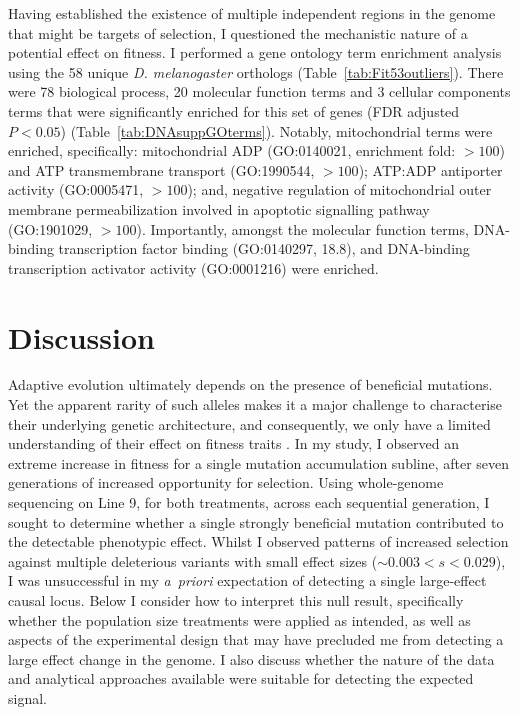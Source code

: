 Having established the existence of multiple independent regions in the genome that might be targets of selection, I questioned the mechanistic nature of a potential effect on fitness. I performed a gene ontology term enrichment analysis using the 58 unique \textit{D. melanogaster} orthologs (Table~\ref{tab:Fit53outliers}). There were 78 biological process, 20 molecular function terms and 3 cellular components terms that were significantly enriched for this set of genes (FDR adjusted $P < 0.05$) (Table~\ref{tab:DNAsuppGOterms}). Notably, mitochondrial terms were enriched, specifically: mitochondrial ADP (GO:0140021, enrichment fold: $>100$) and ATP transmembrane transport (GO:1990544, $>100$); ATP:ADP antiporter activity (GO:0005471, $>100$); and, negative regulation of mitochondrial outer membrane permeabilization involved in apoptotic signalling pathway (GO:1901029, $>100$). Importantly, amongst the molecular function terms, DNA-binding transcription factor binding (GO:0140297, 18.8), and DNA-binding transcription activator activity (GO:0001216) were enriched. \par

\section{Discussion}
Adaptive evolution ultimately depends on the presence of beneficial mutations. Yet the apparent rarity of such alleles makes it a major challenge to characterise their underlying genetic architecture, and consequently, we only have a limited understanding of their effect on fitness traits \citep{Eyre07, Wals18c12}. In my study, I observed an extreme increase in fitness for a single mutation accumulation subline, after seven generations of increased opportunity for selection. Using whole-genome sequencing on Line 9, for both treatments, across each sequential generation, I sought to determine whether a single strongly beneficial mutation contributed to the detectable phenotypic effect. Whilst I observed patterns of increased selection against multiple deleterious variants with small effect sizes ($\sim 0.003 < s < 0.029$), I was unsuccessful in my \textit{a~priori} expectation of detecting a single large-effect causal locus. Below I consider how to interpret this null result, specifically whether the population size treatments were applied as intended, as well as aspects of the experimental design that may have precluded me from detecting a large effect change in the genome. I also discuss whether the nature of the data and analytical approaches available were suitable for detecting the expected signal.\par

